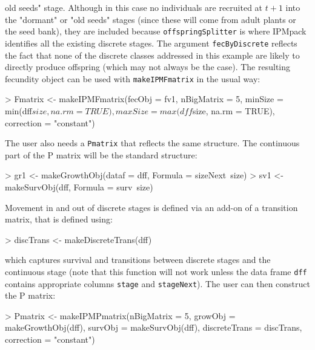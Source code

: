 \documentclass{article}
\begin{document}
old seeds" stage. Although in this case no individuals are recruited at $t+1$
into the "dormant" or "old seeds" stages (since these will come from adult
plants or the seed bank), they are included because {\tt offspringSplitter} is
where IPMpack identifies all the existing discrete stages. The argument {\tt fecByDiscrete} reflects the fact that none of the discrete classes addressed in this example are likely to directly produce offspring (which may not always be the case). The resulting fecundity object can be used with {\tt makeIPMFmatrix} in the usual way:
\begin{Schunk}
\begin{Sinput}
> Fmatrix <- makeIPMFmatrix(fecObj = fv1, nBigMatrix = 5, 
                              minSize = min(dff$size, na.rm = TRUE), 
                              maxSize = max(dff$size, na.rm = TRUE), 
                              correction = "constant")
\end{Sinput}
\end{Schunk}
The user also needs a {\tt Pmatrix} that reflects the same structure. The
continuous part of the P matrix will be the standard structure:
\begin{Schunk}
\begin{Sinput}
> gr1 <- makeGrowthObj(dataf = dff, 
                        Formula = sizeNext~size)
> sv1 <- makeSurvObj(dff,  Formula = surv~size)
\end{Sinput}
\end{Schunk}
Movement in and out of discrete stages is defined via an add-on of a transition matrix, that is defined using: 
\begin{Schunk}
\begin{Sinput}
> discTrans <- makeDiscreteTrans(dff)
\end{Sinput}
\end{Schunk}
which captures survival and transitions between discrete stages and the
continuous stage (note that this function will not work unless the data frame
{\tt dff} contains appropriate columns {\tt stage} and {\tt stageNext}).  The
user can then construct the P matrix:
\begin{Schunk}
\begin{Sinput}
> Pmatrix <- makeIPMPmatrix(nBigMatrix = 5, 	
                              growObj = makeGrowthObj(dff), 
                              survObj = makeSurvObj(dff), 
                              discreteTrans = discTrans, 
                              correction = "constant")
\end{Sinput}
\end{Schunk}
\end{document}

